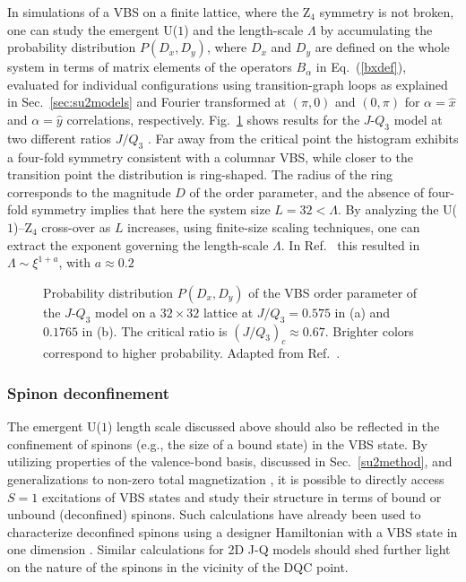 \documentclass[range]{ar2e}
\begin{document}
In simulations of a VBS on a finite lattice, where the Z$_4$ symmetry is not broken, one can study the emergent U($1$) and the length-scale $\Lambda$ by 
accumulating the probability distribution $P(D_x,D_y)$, where $D_x$ and $D_y$ are defined on the whole system in terms of matrix elements of the operators 
$B_\alpha$ in Eq.~(\ref{bxdef}), evaluated for individual configurations using transition-graph loops as explained in Sec.~\ref{sec:su2models} and Fourier 
transformed at $(\pi,0)$ and $(0,\pi)$ for $\alpha=\hat x$ and $\alpha=\hat y$ correlations, respectively. Fig.~\ref{jq3histo} shows results for the $J$-$Q_3$ 
model at two different ratios $J/Q_3$ \cite{lou2009:sun}. Far away from the critical point the histogram exhibits a four-fold symmetry consistent with a columnar 
VBS, while closer to the transition point the distribution is ring-shaped. The radius of the ring corresponds to the magnitude $D$ of the order parameter, and the 
absence of four-fold symmetry implies that here the system size $L=32 < \Lambda$. By analyzing the U($1$)--Z$_4$ cross-over as $L$ increases, using finite-size 
scaling techniques, one can extract the exponent governing the length-scale $\Lambda$. In Ref.~\cite{lou2009:sun} this resulted in  $\Lambda \sim \xi^{1+a}$, with 
$a \approx 0.2$ 


\begin{figure}
\centerline{}
  \caption{Probability distribution $P(D_x,D_y)$ of the VBS order parameter of the $J$-$Q_3$ model on a $32\times 32$
           lattice at $J/Q_3 = 0.575$ in (a) and $0.1765$ in (b). The critical ratio is $(J/Q_3)_c \approx 0.67$. Brighter colors
           correspond to higher probability. Adapted from Ref.~\cite{lou2009:sun}.}  
\label{jq3histo}
\end{figure}

\subsubsection{Spinon deconfinement}

The emergent U($1$) length scale discussed above should also be reflected in the confinement of spinons (e.g., the size of a bound state) in the VBS state. By utilizing 
properties of the valence-bond basis, discussed in Sec.~\ref{su2method}, and generalizations to non-zero total magnetization \cite{Banerjee10b,Wang10}, it is 
possible to directly access $S=1$ excitations of VBS states and study their structure in terms of bound or unbound (deconfined) spinons. Such calculations have 
already been used to characterize deconfined spinons using a designer Hamiltonian with a VBS state in one dimension \cite{Tang11a}. 
Similar calculations for 2D J-Q models should shed further light on the nature of the spinons in the vicinity of the DQC point.
\end{document}

